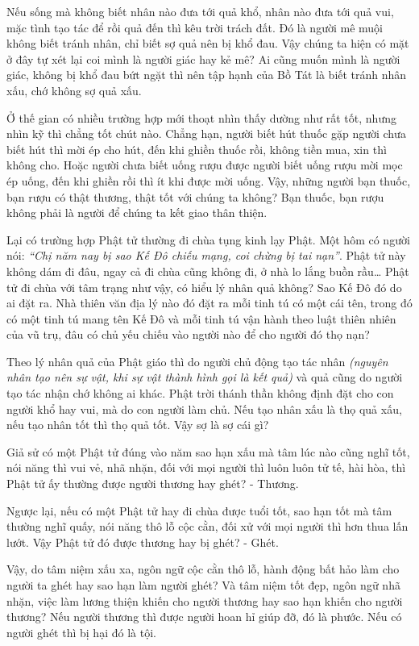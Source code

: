\documentclass[
  12pt,
  oneside]{book}
\begin{document}
Nếu sống mà không biết nhân nào đưa tới quả khổ, nhân nào đưa tới quả vui, mặc tình tạo tác để rồi quả đến thì kêu trời trách đất. Đó là người mê muội không biết tránh nhân, chỉ biết sợ quả nên bị khổ đau. Vậy chúng ta hiện có mặt ở đây tự xét lại coi mình là người giác hay kẻ mê? Ai cũng muốn mình là người giác, không bị khổ đau bứt ngặt thì nên tập hạnh của Bồ Tát là biết tránh nhân xấu, chớ không sợ quả xấu.

Ở thế gian có nhiều trường hợp mới thoạt nhìn thấy dường như rất tốt, nhưng nhìn kỹ thì chẳng tốt chút nào. Chẳng hạn, người biết hút thuốc gặp người chưa biết hút thì mời ép cho hút, đến khi ghiền thuốc rồi, không tiền mua, xin thì không cho. Hoặc người chưa biết uống rượu được người biết uống rượu mời mọc ép uống, đến khi ghiền rồi thì ít khi được mời uống. Vậy, những người bạn thuốc, bạn rượu có thật thương, thật tốt với chúng ta không? Bạn thuốc, bạn rượu không phải là người để chúng ta kết giao thân thiện.

Lại có trường hợp Phật tử thường đi chùa tụng kinh lạy Phật. Một hôm có người nói: \emph{``Chị năm nay bị sao Kế Đô chiếu mạng, coi chừng bị tai nạn''}. Phật tử này không dám đi đâu, ngay cả đi chùa cũng không đi, ở nhà lo lắng buồn rầu\ldots{} Phật tử đi chùa với tâm trạng như vậy, có hiểu lý nhân quả không? Sao Kế Đô đó do ai đặt ra. Nhà thiên văn địa lý nào đó đặt ra mỗi tinh tú có một cái tên, trong đó có một tinh tú mang tên Kế Đô và mỗi tinh tú vận hành theo luật thiên nhiên của vũ trụ, đâu có chủ yếu chiếu vào người nào để cho người đó thọ nạn?

Theo lý nhân quả của Phật giáo thì do người chủ động tạo tác nhân \emph{(nguyên nhân tạo nên sự vật, khi sự vật thành hình gọi là kết quả)} và quả cũng do người tạo tác nhận chớ không ai khác. Phật trời thánh thần không định đặt cho con người khổ hay vui, mà do con người làm chủ. Nếu tạo nhân xấu là thọ quả xấu, nếu tạo nhân tốt thì thọ quả tốt. Vậy sợ là sợ cái gì?

Giả sử có một Phật tử đúng vào năm sao hạn xấu mà tâm lúc nào cũng nghĩ tốt, nói năng thì vui vẻ, nhã nhặn, đối với mọi người thì luôn luôn tử tế, hài hòa, thì Phật tử ấy thường được người thương hay ghét? - Thương.

Ngược lại, nếu có một Phật tử hay đi chùa được tuổi tốt, sao hạn tốt mà tâm thường nghĩ quấy, nói năng thô lỗ cộc cằn, đối xử với mọi người thì hơn thua lấn lướt. Vậy Phật tử đó được thương hay bị ghét? - Ghét.

Vậy, do tâm niệm xấu xa, ngôn ngữ cộc cằn thô lỗ, hành động bất hảo làm cho người ta ghét hay sao hạn làm người ghét? Và tâm niệm tốt đẹp, ngôn ngữ nhã nhặn, việc làm lương thiện khiến cho người thương hay sao hạn khiến cho người thương? Nếu người thương thì được người hoan hỉ giúp đỡ, đó là phước. Nếu có người ghét thì bị hại đó là tội.
\end{document}
